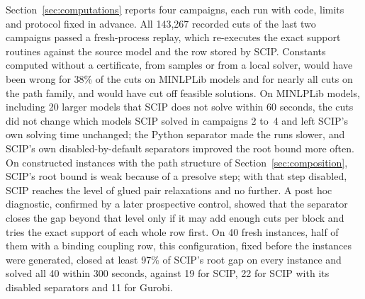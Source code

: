 Section~\ref{sec:computations} reports four campaigns, each run with code,
limits and protocol fixed in advance. All 143{,}267 recorded cuts of the last
two campaigns passed a fresh-process replay, which re-executes the exact
support routines against the source model and the row stored by SCIP.
Constants computed without a certificate, from samples or from a local solver,
would have been wrong for 38\% of the cuts on MINLPLib models and for nearly
all cuts on the path family, and would have cut off feasible solutions. On MINLPLib models, including 20 larger models that SCIP
does not solve within 60 seconds, the cuts did not change which models SCIP
solved in campaigns 2 to~4 and left SCIP's own solving time unchanged; the
Python separator made the runs slower, and SCIP's own disabled-by-default
separators improved the root bound more often. On constructed instances with
the path structure of Section~\ref{sec:composition}, SCIP's root bound is weak
because of a presolve step; with that step disabled, SCIP reaches the level of
glued pair relaxations and no further. A post hoc diagnostic, confirmed by a
later prospective control, showed that the separator closes the gap beyond
that level only if it may add enough cuts per block and tries the exact
support of each whole row first. On 40 fresh
instances, half of them with a binding coupling row, this configuration, fixed
before the instances were generated, closed at least 97\% of SCIP's root gap
on every instance and solved all 40 within 300 seconds, against 19 for SCIP,
22 for SCIP with its disabled separators and 11 for Gurobi.

